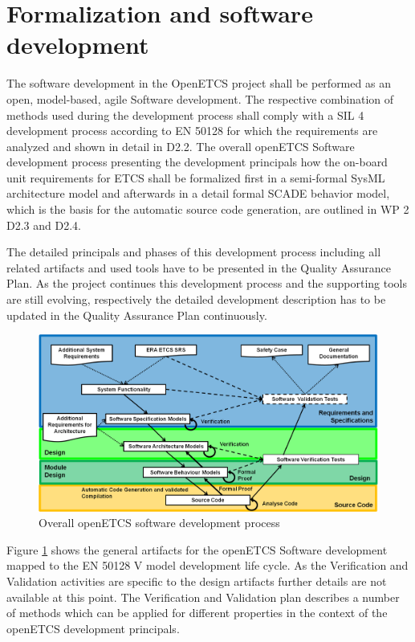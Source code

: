 \documentclass{template/openetcs_report}
\begin{document}
\section{Formalization and software development}

The software development in the OpenETCS project shall be performed as an open, model-based, agile Software development. The respective combination of methods used during the development process shall comply with a SIL 4 development process according to EN 50128 for which the requirements are analyzed and shown in detail in D2.2. The overall openETCS Software development process presenting the development principals how the on-board unit requirements for ETCS shall be formalized first in a semi-formal SysML architecture model and afterwards in a detail formal SCADE behavior model, which is the basis for the automatic source code generation, are outlined in WP 2 D2.3 and D2.4. 

The detailed principals and phases of this development process including all related artifacts and used tools have to be presented in the Quality Assurance Plan.  As the project continues this development process and the supporting tools are still evolving, respectively the detailed development description has to be updated in the Quality Assurance Plan continuously.

\begin{figure}[htbp]
\centering
\includegraphics[width=0.9\linewidth]{./images/openETCS-Software-Development}
\caption{Overall openETCS software development process}
\label{fig:DevopmentProcess}
\end{figure}

Figure \ref{fig:DevopmentProcess} shows the general artifacts for the openETCS Software development mapped to the EN 50128 V model development life cycle. As the Verification and Validation activities are specific to the design artifacts further details are not available at this point. The Verification and Validation plan describes a number of methods which can be applied for different properties in the context of the openETCS development principals.
\end{document}
